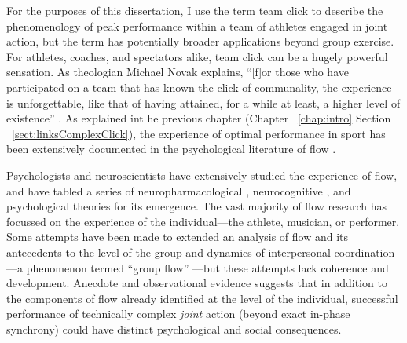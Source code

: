 \begin{CJK}{UTF8}{gbsn}

For the purposes of this dissertation, I use the term team click to describe the phenomenology of peak performance within a team of athletes engaged in joint action, but the term has potentially broader applications beyond group exercise.  For athletes, coaches, and spectators alike, team click can be a hugely powerful sensation.  As theologian Michael Novak explains, ``[f]or those who have participated on a team that has known the click of communality, the experience is unforgettable, like that of having attained, for a while at least, a higher level of existence'' \citep[11]{White2011}.  As explained int he previous chapter (Chapter ~\ref{chap:intro} Section ~\ref{sect:linksComplexClick}), the experience of optimal performance in sport has been extensively documented in the psychological literature of flow \citep{Csikszentmihalyi1992,Jackson1995,Jackson1999,McNeill1995}.

Psychologists and neuroscientists have extensively studied the experience of flow, and have tabled a series of neuropharmacological \citep{Boecker2008}, neurocognitive \citep{Dietrich2006,Dietrich2011,Labelle2013}, and psychological \citep{Csikszentmihalyi1992} theories for its emergence.  The vast majority of flow research has focussed on the experience of the individual---the athlete, musician, or performer.  Some attempts have been made to extended an analysis of flow and its antecedents to the level of the group and dynamics of interpersonal coordination---a phenomenon termed ``group flow'' \citep{Sawyer2006}---but these attempts lack coherence and development.  Anecdote and observational evidence suggests that in addition to the components of flow already identified at the level of the individual, successful performance of technically complex
\textit{joint} action (beyond exact in-phase synchrony) could have distinct psychological and social consequences.






\end{CJK}
